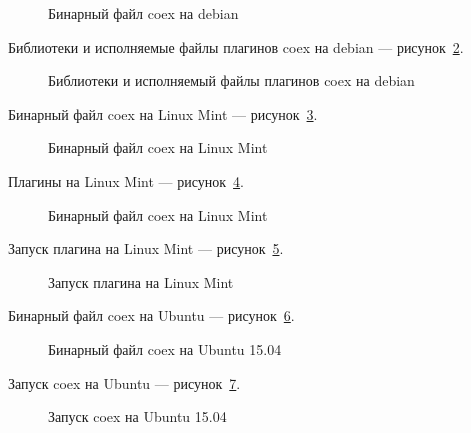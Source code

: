 \begin{figure}[h!]
\caption{ Бинарный файл coex на debian}
\label{debian:debian}
\end{figure}

Библиотеки и исполняемые файлы плагинов coex на debian --- рисунок~\ref{debian2:debian2}.

\begin{figure}[h!]
\caption{ Библиотеки и исполняемый файлы плагинов coex на debian}
\label{debian2:debian2}
\end{figure}

Бинарный файл coex на Linux Mint --- рисунок~\ref{Linux_Mint:Linux_Mint}.

\begin{figure}[h!]
\caption{ Бинарный файл coex на Linux Mint}
\label{Linux_Mint:Linux_Mint}
\end{figure}

Плагины на Linux Mint --- рисунок~\ref{Plugins:Plugins}.

\begin{figure}[h!]
\caption{ Бинарный файл coex на Linux Mint}
\label{Plugins:Plugins}
\end{figure}

Запуск плагина на Linux Mint --- рисунок~\ref{Zapusk:Zapusk}.

\begin{figure}[h!]
\caption{ Запуск плагина на Linux Mint}
\label{Zapusk:Zapusk}
\end{figure}

Бинарный файл coex на Ubuntu --- рисунок~\ref{ubuntu:ubuntu}.

\begin{figure}[h!]
\caption{ Бинарный файл coex на Ubuntu 15.04 }
\label{ubuntu:ubuntu}
\end{figure}

Запуск coex на Ubuntu --- рисунок~\ref{ubuntu2:ubuntu2}.

\begin{figure}[h!]
\caption{ Запуск coex на Ubuntu 15.04 }
\label{ubuntu2:ubuntu2}
\end{figure}

\clearpage








